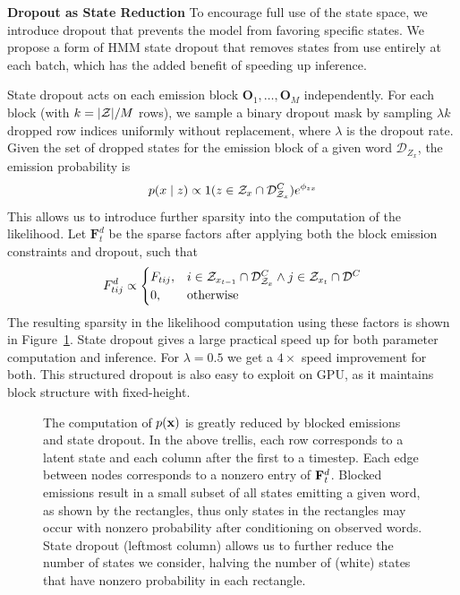 \documentclass[11pt,a4paper]{article}
\begin{document}
\noindent
\textbf{Dropout as State Reduction}
To encourage full use of the state space,
we introduce dropout that prevents the model from favoring specific states. 
We propose a form of HMM state dropout that removes states from use entirely
at each batch,
which has the added benefit of speeding up inference.

State dropout acts on each emission block $\mathbf{O}_1, \ldots, \mathbf{O}_M$ independently.
For each block (with $k=|{\cal Z}| / M$ rows), we sample a binary dropout mask by sampling
$ \lambda k$ dropped row indices uniformly without replacement,
where $\lambda$ is the dropout rate.
Given the set of dropped states for the emission block of a given word $\mathcal{D}_{Z_x}$,
the emission probability is
\begin{equation}
\label{eqn:state_dropout}
p(x \mid z) \propto 1(z \in \mathcal{Z}_x \cap \mathcal{D}_{\mathcal{Z}_x}^C)e^{\phi_{zx}}
\end{equation}
This allows us to introduce further sparsity into the computation of the likelihood.
Let $\mathbf{F}_t^d$ be the sparse factors after applying both the block emission constraints
and dropout, such that
\begin{equation}
\label{eqn:dropout_factors}
F_{tij}^d \propto \begin{cases}
F_{tij}, & i\in\mathcal{Z}_{x_{t-1}}\cap \mathcal{D}_{\mathcal{Z}_x}^C \wedge j\in\mathcal{Z}_{x_t} \cap\mathcal{D}^C\\
0, & \textrm{otherwise}
\end{cases}
\end{equation}
The resulting sparsity in the likelihood computation using these factors is shown in 
Figure~\ref{fig:trellis}.
State dropout gives a large practical speed up for both parameter computation and inference.
For $\lambda=0.5$ we get a $4\times$ speed improvement for both.
This structured dropout is also easy to exploit on GPU,
as it maintains block structure with fixed-height.

\begin{figure}[!t]
\begin{center}

\end{center}
\caption{
\label{fig:trellis}
The computation of $p(\mathbf{x})$ is greatly reduced by blocked emissions and state dropout.
In the above trellis, each row corresponds to a latent state and each column after 
the first to a timestep.
Each edge between nodes corresponds to a nonzero entry of $\mathbf{F}_t^d$.
Blocked emissions result in a small subset of all states emitting a given word,
as shown by the rectangles, thus only states in the rectangles may occur
with nonzero probability after conditioning on observed words.
State dropout (leftmost column) allows us to further reduce the number of states we consider,
halving the number of (white) states that have nonzero probability in each rectangle.
}
\end{figure}
\end{document}
